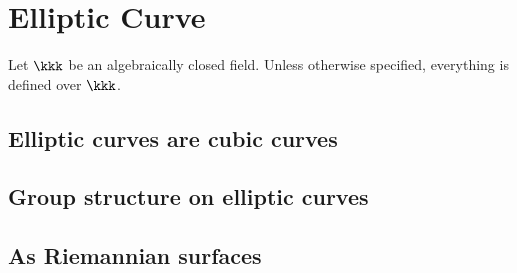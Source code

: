 \section{Elliptic Curve}

Let \(\kkk\) be an algebraically closed field.
Unless otherwise specified, everything is defined over \(\kkk\).

\subsection{Elliptic curves are cubic curves}


\subsection{Group structure on elliptic curves}


\subsection{As Riemannian surfaces}